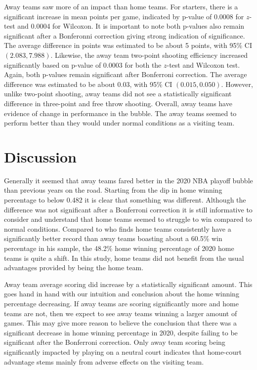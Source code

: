 \documentclass[12pt, letterpaper, titlepage]{article}
\begin{document}
Away teams saw more of an impact than home teams. For starters, there is a
significant increase in mean points per game, indicated by p-value of 0.0008 for \(z\)-test and
0.0004 for Wilcoxon. It is important to note both p-values also remain significant after
a Bonferonni correction giving strong indication of significance. The average difference in points was estimated to
be about 5 points, with 95\% CI \((2.083, 7.988)\). Likewise, the away team two-point
shooting efficiency increased significantly based on p-value of 0.0003
for both the \(z\)-test and Wilcoxon test. Again, both p-values remain significant after Bonferroni correction.
The average difference was estimated to be about 0.03, with 95\% CI \((0.015, 0.050)\). However,
unlike two-point shooting, away teams did not see a statistically significant difference in three-point and free
throw shooting. Overall, away teams have evidence of change in performance in
the bubble. The away teams seemed to perform better than they would under normal
conditions as a visiting team.

\hypertarget{sec:disc}{%
\section{Discussion}\label{sec:disc}}

Generally it seemed that away teams fared better in the 2020 NBA playoff bubble
than previous years on the road. Starting from the dip in home winning percentage
to below 0.482 it is clear that something was different. Although the difference was not
significant after a Bonferroni correction it is still informative to consider and
understand that home teams seemed to struggle to win compared to normal conditions.
Compared to \citet{Kotecki} who finds home teams consistently have a significantly
better record than away teams boasting about a 60.5\% win percentage in his sample,
the 48.2\% home winning percentage of 2020 home teams is quite a shift.
In this study, home teams did not benefit from the usual advantages provided by
being the home team.

Away team average
scoring did increase by a statistically significant amount. This goes hand in
hand with our intuition and conclusion about the home winning percentage
decreasing. If away teams are scoring significantly more and home teams are not,
then we expect to see away teams winning a larger amount of games. This may give
more reason to believe the conclusion that there was a significant decrease in
home winning percentage in 2020, despite failing to be significant
after the Bonferroni
correction. Only away team scoring being significantly impacted by playing on
a neutral court indicates that home-court advantage stems mainly from adverse
effects on the visiting team.
\end{document}
